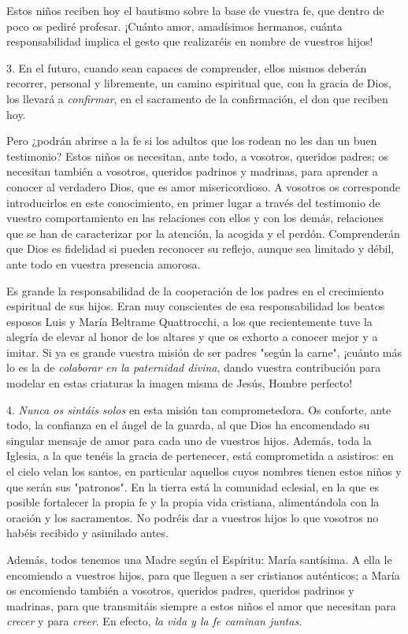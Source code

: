 \documentclass[]{article}
\begin{document}
Estos niños reciben hoy el bautismo sobre la base de vuestra fe, que
dentro de poco os pediré profesar. ¡Cuánto amor, amadísimos hermanos,
cuánta responsabilidad implica el gesto que realizaréis en nombre de
vuestros hijos!

3. En el futuro, cuando sean capaces de comprender, ellos mismos deberán
recorrer, personal y libremente, un camino espiritual que, con la gracia
de Dios, los llevará a \emph{confirmar}, en el sacramento de la
confirmación, el don que reciben hoy.

Pero ¿podrán abrirse a la fe si los adultos que los rodean no les dan un
buen testimonio? Estos niños os necesitan, ante todo, a vosotros,
queridos padres; os necesitan también a vosotros, queridos padrinos y
madrinas, para aprender a conocer al verdadero Dios, que es amor
misericordioso. A vosotros os corresponde introducirlos en este
conocimiento, en primer lugar a través del testimonio de vuestro
comportamiento en las relaciones con ellos y con los demás, relaciones
que se han de caracterizar por la atención, la acogida y el perdón.
Comprenderán que Dios es fidelidad si pueden reconocer su reflejo,
aunque sea limitado y débil, ante todo en vuestra presencia amorosa.

Es grande la responsabilidad de la cooperación de los padres en el
crecimiento espiritual de sus hijos. Eran muy conscientes de esa
responsabilidad los beatos esposos Luis y María Beltrame Quattrocchi, a
los que recientemente tuve la alegría de elevar al honor de los altares
y que os exhorto a conocer mejor y a imitar. Si ya es grande vuestra
misión de ser padres "según la carne", ¡cuánto más lo es la de
\emph{colaborar en la paternidad divina}, dando vuestra contribución
para modelar en estas criaturas la imagen misma de Jesús, Hombre
perfecto!

4. \emph{Nunca os sintáis solos} en esta misión tan comprometedora. Os
conforte, ante todo, la confianza en el ángel de la guarda, al que Dios
ha encomendado su singular mensaje de amor para cada uno de vuestros
hijos. Además, toda la Iglesia, a la que tenéis la gracia de pertenecer,
está comprometida a asistiros: en el cielo velan los santos, en
particular aquellos cuyos nombres tienen estos niños y que serán sus
"patronos". En la tierra está la comunidad eclesial, en la que es
posible fortalecer la propia fe y la propia vida cristiana,
alimentándola con la oración y los sacramentos. No podréis dar a
vuestros hijos lo que vosotros no habéis recibido y asimilado antes.

Además, todos tenemos una Madre según el Espíritu: María santísima. A
ella le encomiendo a vuestros hijos, para que lleguen a ser cristianos
auténticos; a María os encomiendo también a vosotros, queridos padres,
queridos padrinos y madrinas, para que transmitáis siempre a estos niños
el amor que necesitan para \emph{crecer} y para \emph{creer}. En efecto,
\emph{la vida y la fe caminan juntas}.
\end{document}
